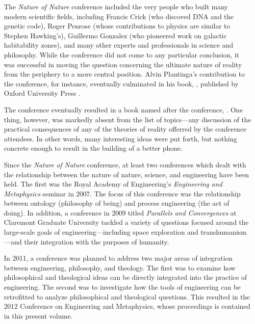The \textit{Nature of Nature} conference included the very people who built many modern scientific fields, including Francis Crick (who discoved DNA and the genetic code), Roger Penrose (whose contributions to physics are similar to Stephen Hawking's), Guillermo Gonzalez (who pioneered work on galactic habitability zones), and many other experts and professionals in science and philosophy.  While the conference did not come to any particular conclusion, it was successful in moving the question concerning the ultimate nature of reality from the periphery to a more central position.  Alvin Plantinga's contribution to the conference, for instance, eventually culminated in his book, , published by Oxford University Press \citep{plantinga2011, plantinga2011b}.

The conference eventually resulted in a book named after the conference,  \citep{natnat2011}.  One thing, however, was markedly absent from the list of topics---any discussion of the practical consequences of any of the theories of reality offerred by the conference attendees. In other words, many interesting ideas were put forth, but nothing concrete enough to result in the building of a better phone.

Since the \textit{Nature of Nature} conference, at least two conferences which dealt with the relationship between the nature of nature, science, and engineering have been held.
The first was the Royal Academy of Engineering's \textit{Engineering and Metaphysics} seminar in 2007.  The focus of this conference was the relationship between ontology (philosophy of being) and process engineering (the act of doing).  In addition,  a conference in 2009 titled \textit{Parallels and Convergences} at Claremont Graduate University tackled a variety of questions focused around the large-scale goals of engineering---including space exploration and transhumanism---and their integration with the purposes of humanity.  

In 2011, a conference was planned to address two major areas of integration between engineering, philosophy, and theology.  The first was to examine how philosophical and theological ideas can be directly integrated into the practice of engineering.  The second was to investigate how the tools of engineering can be retrofitted to analyze philosophical and theological questions.  This resulted in the 2012 Conference on Engineering and Metaphysics, whose proceedings is contained in this present volume.

